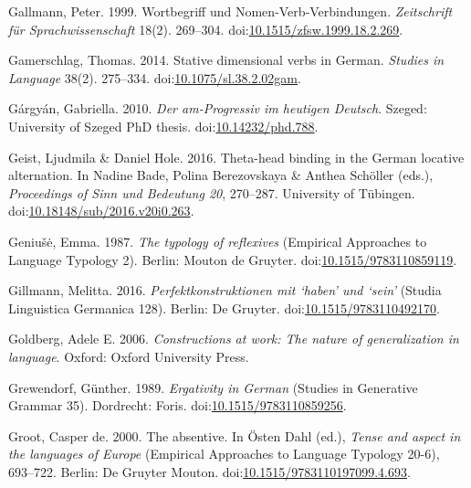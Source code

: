 \leavevmode{}%
Gallmann, Peter. 1999. Wortbegriff und {Nomen‐Verb‐Verbindungen}.
\emph{Zeitschrift für Sprachwissenschaft} 18(2). 269--304.
doi:\href{https://doi.org/10.1515/zfsw.1999.18.2.269}{10.1515/zfsw.1999.18.2.269}.

\leavevmode{}%
Gamerschlag, Thomas. 2014. Stative dimensional verbs in {German}.
\emph{Studies in Language} 38(2). 275--334.
doi:\href{https://doi.org/10.1075/sl.38.2.02gam}{10.1075/sl.38.2.02gam}.

\leavevmode{}%
Gárgyán, Gabriella. 2010. \emph{Der \emph{am}-{Progressiv} im heutigen
{Deutsch}}. Szeged: University of Szeged PhD thesis.
doi:\href{https://doi.org/10.14232/phd.788}{10.14232/phd.788}.

\leavevmode{}%
Geist, Ljudmila \& Daniel Hole. 2016. Theta-head binding in the {German}
locative alternation. In Nadine Bade, Polina Berezovskaya \& Anthea
Schöller (eds.), \emph{Proceedings of {Sinn} und {Bedeutung} 20},
270--287. University of Tübingen.
doi:\href{https://doi.org/10.18148/sub/2016.v20i0.263}{10.18148/sub/2016.v20i0.263}.

\leavevmode{}%
Geniušė, Emma. 1987. \emph{The typology of reflexives} (Empirical
Approaches to Language Typology 2). Berlin: Mouton de Gruyter.
doi:\href{https://doi.org/10.1515/9783110859119}{10.1515/9783110859119}.

\leavevmode{}%
Gillmann, Melitta. 2016. \emph{Perfektkonstruktionen mit {`haben'} und
{`sein'}} (Studia Linguistica Germanica 128). Berlin: De Gruyter.
doi:\href{https://doi.org/10.1515/9783110492170}{10.1515/9783110492170}.

\leavevmode{}%
Goldberg, Adele E. 2006. \emph{Constructions at work: The nature of
generalization in language}. Oxford: Oxford University Press.

\leavevmode{}%
Grewendorf, Günther. 1989. \emph{Ergativity in {German}} (Studies in
Generative Grammar 35). Dordrecht: Foris.
doi:\href{https://doi.org/10.1515/9783110859256}{10.1515/9783110859256}.

\leavevmode{}%
Groot, Casper de. 2000. The absentive. In Östen Dahl (ed.), \emph{Tense
and aspect in the languages of {Europe}} (Empirical Approaches to
Language Typology 20-6), 693--722. Berlin: De Gruyter Mouton.
doi:\href{https://doi.org/10.1515/9783110197099.4.693}{10.1515/9783110197099.4.693}.

